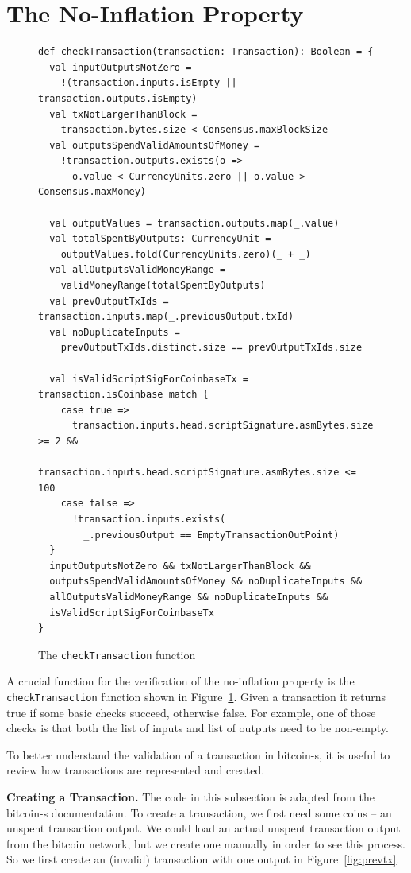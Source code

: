 \documentclass[runningheads]{llncs}
\renewcommand{\paragraph}{\textbf}%
\begin{document}
\section{The No-Inflation Property}

\begin{figure}
\begin{lstlisting}[style=scala]
def checkTransaction(transaction: Transaction): Boolean = {
  val inputOutputsNotZero =
    !(transaction.inputs.isEmpty || transaction.outputs.isEmpty)
  val txNotLargerThanBlock = 
    transaction.bytes.size < Consensus.maxBlockSize
  val outputsSpendValidAmountsOfMoney = 
    !transaction.outputs.exists(o =>
      o.value < CurrencyUnits.zero || o.value > Consensus.maxMoney)

  val outputValues = transaction.outputs.map(_.value)
  val totalSpentByOutputs: CurrencyUnit =
    outputValues.fold(CurrencyUnits.zero)(_ + _)
  val allOutputsValidMoneyRange = 
    validMoneyRange(totalSpentByOutputs)
  val prevOutputTxIds = transaction.inputs.map(_.previousOutput.txId)
  val noDuplicateInputs = 
    prevOutputTxIds.distinct.size == prevOutputTxIds.size

  val isValidScriptSigForCoinbaseTx = transaction.isCoinbase match {
    case true =>
      transaction.inputs.head.scriptSignature.asmBytes.size >= 2 &&
        transaction.inputs.head.scriptSignature.asmBytes.size <= 100
    case false =>
      !transaction.inputs.exists(
        _.previousOutput == EmptyTransactionOutPoint)
  }
  inputOutputsNotZero && txNotLargerThanBlock && 
  outputsSpendValidAmountsOfMoney && noDuplicateInputs &&
  allOutputsValidMoneyRange && noDuplicateInputs && 
  isValidScriptSigForCoinbaseTx
}
\end{lstlisting}
  
  \caption{The \texttt{checkTransaction} function}
  \label{fig:checktrans}
\end{figure}


A crucial function for the verification of the no-inflation property
is the \texttt{checkTransaction} function shown in
Figure~\ref{fig:checktrans}. Given a transaction it returns true if
some basic checks succeed, otherwise false. For example, one of those
checks is that both the list of inputs and list of outputs need to be
non-empty.

To better understand the validation of a transaction in bitcoin-s, it
is useful to review how transactions are represented and created.

\paragraph{Creating a Transaction.} The code in this subsection is
adapted from the bitcoin-s documentation. To create a transaction, we
first need some coins -- an unspent transaction output. We could load
an actual unspent transaction output from the bitcoin network, but we
create one manually in order to see this process. So we first create
an (invalid) transaction with one output in Figure~\ref{fig:prevtx}.
\end{document}
